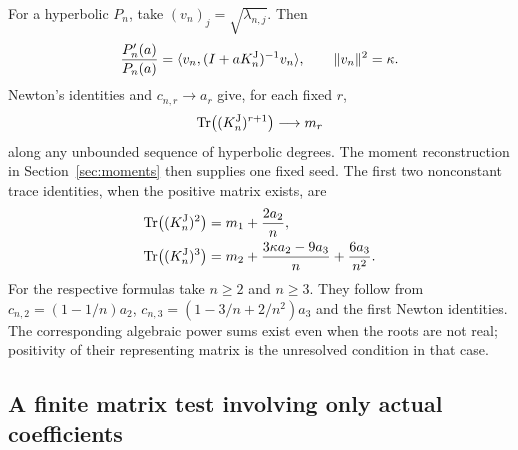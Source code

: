 \documentclass[11pt,a4paper]{article}
\numberwithin{equation}{section}
\theoremstyle{definition}
\theoremstyle{remark}
\newcommand{\ip}[2]{\langle #1,#2\rangle}
\newcommand{\norm}[1]{\lVert #1\rVert}
\DeclareMathOperator{\Tr}{Tr}
\begin{document}
For a hyperbolic $P_n$, take $(v_n)_j=\sqrt{\lambda_{n,j}}$.
Then
\begin{equation}\label{can-jen-vector}
 \frac{P_n'(a)}{P_n(a)}
 =\ip{v_n}{(I+aK_n^{\rm J})^{-1}v_n},\qquad
 \norm{v_n}^2=\kappa.
\end{equation}
Newton's identities and $c_{n,r}\to a_r$ give, for each fixed $r$,
\begin{equation}\label{can-jen-trace}
 \Tr\bigl((K_n^{\rm J})^{r+1}\bigr)\longrightarrow m_r
\end{equation}
along any unbounded sequence of hyperbolic degrees.
The moment reconstruction in Section~\ref{sec:moments} then supplies
one fixed seed. The first two nonconstant trace identities, when the
positive matrix exists, are
\begin{align}
 \Tr\bigl((K_n^{\rm J})^2\bigr)
 &=m_1+\frac{2a_2}{n},\label{can-jen-trace2}\\
 \Tr\bigl((K_n^{\rm J})^3\bigr)
 &=m_2+\frac{3\kappa a_2-9a_3}{n}
       +\frac{6a_3}{n^2}.\label{can-jen-trace3}
\end{align}
For the respective formulas take $n\geq2$ and $n\geq3$.
They follow from $c_{n,2}=(1-1/n)a_2$,
$c_{n,3}=(1-3/n+2/n^2)a_3$ and the first Newton identities.
The corresponding algebraic power sums exist even when the roots
are not real; positivity of their representing matrix is the unresolved
condition in that case.

\subsection{A finite matrix test involving only actual coefficients}
\end{document}
